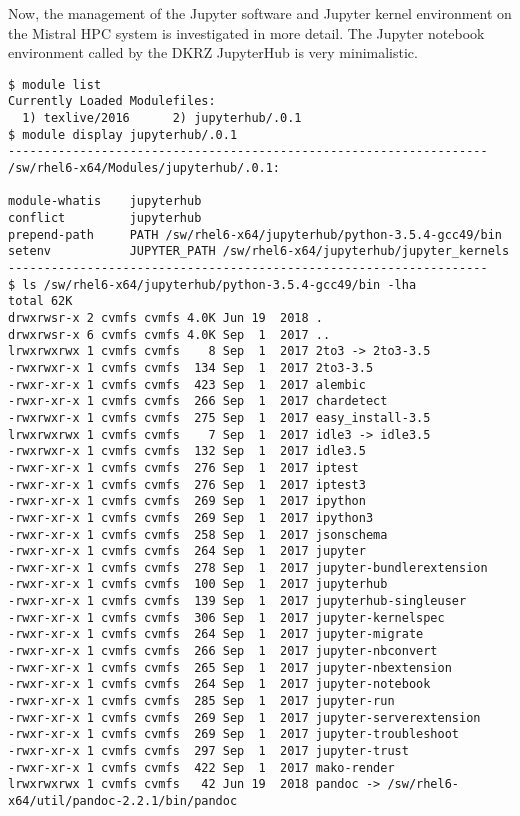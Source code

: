 Now, the management of the Jupyter software and Jupyter kernel environment on the Mistral HPC system is investigated in more detail.
The Jupyter notebook environment called by the DKRZ JupyterHub is very minimalistic.

\begin{verbatim}
$ module list
Currently Loaded Modulefiles:
  1) texlive/2016      2) jupyterhub/.0.1
$ module display jupyterhub/.0.1
-------------------------------------------------------------------
/sw/rhel6-x64/Modules/jupyterhub/.0.1:

module-whatis    jupyterhub
conflict         jupyterhub
prepend-path     PATH /sw/rhel6-x64/jupyterhub/python-3.5.4-gcc49/bin
setenv           JUPYTER_PATH /sw/rhel6-x64/jupyterhub/jupyter_kernels
-------------------------------------------------------------------
$ ls /sw/rhel6-x64/jupyterhub/python-3.5.4-gcc49/bin -lha
total 62K
drwxrwsr-x 2 cvmfs cvmfs 4.0K Jun 19  2018 .
drwxrwsr-x 6 cvmfs cvmfs 4.0K Sep  1  2017 ..
lrwxrwxrwx 1 cvmfs cvmfs    8 Sep  1  2017 2to3 -> 2to3-3.5
-rwxrwxr-x 1 cvmfs cvmfs  134 Sep  1  2017 2to3-3.5
-rwxr-xr-x 1 cvmfs cvmfs  423 Sep  1  2017 alembic
-rwxr-xr-x 1 cvmfs cvmfs  266 Sep  1  2017 chardetect
-rwxrwxr-x 1 cvmfs cvmfs  275 Sep  1  2017 easy_install-3.5
lrwxrwxrwx 1 cvmfs cvmfs    7 Sep  1  2017 idle3 -> idle3.5
-rwxrwxr-x 1 cvmfs cvmfs  132 Sep  1  2017 idle3.5
-rwxr-xr-x 1 cvmfs cvmfs  276 Sep  1  2017 iptest
-rwxr-xr-x 1 cvmfs cvmfs  276 Sep  1  2017 iptest3
-rwxr-xr-x 1 cvmfs cvmfs  269 Sep  1  2017 ipython
-rwxr-xr-x 1 cvmfs cvmfs  269 Sep  1  2017 ipython3
-rwxr-xr-x 1 cvmfs cvmfs  258 Sep  1  2017 jsonschema
-rwxr-xr-x 1 cvmfs cvmfs  264 Sep  1  2017 jupyter
-rwxr-xr-x 1 cvmfs cvmfs  278 Sep  1  2017 jupyter-bundlerextension
-rwxr-xr-x 1 cvmfs cvmfs  100 Sep  1  2017 jupyterhub
-rwxr-xr-x 1 cvmfs cvmfs  139 Sep  1  2017 jupyterhub-singleuser
-rwxr-xr-x 1 cvmfs cvmfs  306 Sep  1  2017 jupyter-kernelspec
-rwxr-xr-x 1 cvmfs cvmfs  264 Sep  1  2017 jupyter-migrate
-rwxr-xr-x 1 cvmfs cvmfs  266 Sep  1  2017 jupyter-nbconvert
-rwxr-xr-x 1 cvmfs cvmfs  265 Sep  1  2017 jupyter-nbextension
-rwxr-xr-x 1 cvmfs cvmfs  264 Sep  1  2017 jupyter-notebook
-rwxr-xr-x 1 cvmfs cvmfs  285 Sep  1  2017 jupyter-run
-rwxr-xr-x 1 cvmfs cvmfs  269 Sep  1  2017 jupyter-serverextension
-rwxr-xr-x 1 cvmfs cvmfs  269 Sep  1  2017 jupyter-troubleshoot
-rwxr-xr-x 1 cvmfs cvmfs  297 Sep  1  2017 jupyter-trust
-rwxr-xr-x 1 cvmfs cvmfs  422 Sep  1  2017 mako-render
lrwxrwxrwx 1 cvmfs cvmfs   42 Jun 19  2018 pandoc -> /sw/rhel6-x64/util/pandoc-2.2.1/bin/pandoc

\end{verbatim}
